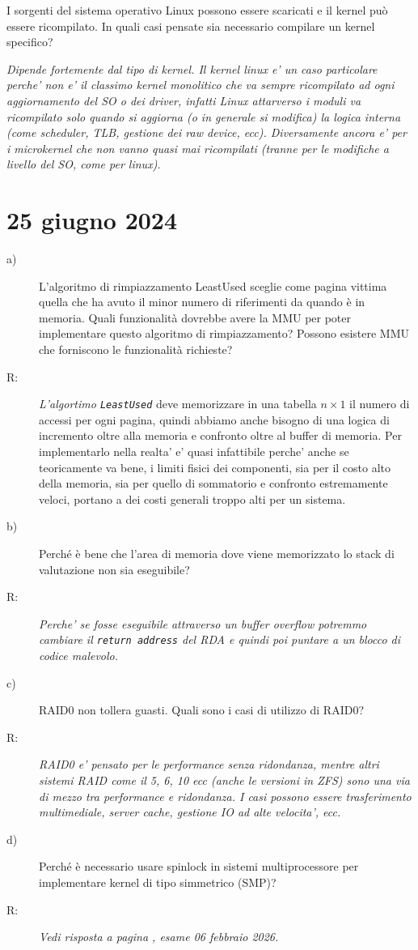 \documentclass[a4paper,12pt]{article}
\newcommand{\datasection}[1]{%
    \section*{#1}%
    \addcontentsline{toc}{section}{#1}%
}
\newenvironment{exambox}{%
    \begin{mdframed}[
        linecolor=black!70,
        linewidth=0.6pt,
        innerleftmargin=8pt,
        innerrightmargin=8pt,
        innertopmargin=6pt,
        innerbottommargin=6pt
    ]
    \begin{description}
}{%
    \end{description}
    \end{mdframed}
}
\begin{document}
\begin{exambox}
{}
\item[d)] I sorgenti del sistema operativo Linux possono essere scaricati e il kernel può essere ricompilato. In quali casi pensate sia necessario compilare un kernel specifico?
\item[R:] \textit{Dipende fortemente dal tipo di kernel. Il kernel linux e' un caso particolare perche' non e' il classimo kernel monolitico che va sempre ricompilato ad ogni aggiornamento del SO o dei driver, infatti Linux attarverso i moduli va ricompilato solo quando si aggiorna (o in generale si modifica) la logica interna (come scheduler, TLB, gestione dei raw device, ecc). Diversamente ancora e' per i microkernel che non vanno quasi mai ricompilati (tranne per le modifiche a livello del SO, come per linux).}
\end{exambox}

\newpage
\datasection{25 giugno 2024}
\begin{exambox}
\item[a)] L'algoritmo di rimpiazzamento LeastUsed sceglie come pagina vittima quella che ha avuto il minor numero di riferimenti da quando è in memoria. Quali funzionalità dovrebbe avere la MMU per poter implementare questo algoritmo di rimpiazzamento? Possono esistere MMU che forniscono le funzionalità richieste?
\item[R:] \textit{L'algortimo \texttt{LeastUsed}} deve memorizzare in una tabella $n\times 1$ il numero di accessi per ogni pagina, quindi abbiamo anche bisogno di una logica di incremento oltre alla memoria e confronto oltre al buffer di memoria. Per implementarlo nella realta' e' quasi infattibile perche' anche se teoricamente va bene, i limiti fisici dei componenti, sia per il costo alto della memoria, sia per quello di sommatorio e confronto estremamente veloci, portano a dei costi generali troppo alti per un sistema.
\item[b)] Perché è bene che l'area di memoria dove viene memorizzato lo stack di valutazione non sia eseguibile?
\item[R:] \textit{Perche' se fosse eseguibile attraverso un buffer overflow potremmo cambiare il \texttt{return address} del RDA e quindi poi puntare a un blocco di codice malevolo.}
\item[c)] RAID0 non tollera guasti. Quali sono i casi di utilizzo di RAID0?
\item[R:] \textit{RAID0 e' pensato per le performance senza ridondanza, mentre altri sistemi RAID come il 5, 6, 10 ecc (anche le versioni in ZFS) sono una via di mezzo tra performance e ridondanza. I casi possono essere trasferimento multimediale, server cache, gestione IO ad alte velocita', ecc.}
\item[d)] Perché è necessario usare spinlock in sistemi multiprocessore per implementare kernel di tipo simmetrico (SMP)?
\item[R:] \textit{Vedi risposta a pagina \pageref{risposta:spinlock}, esame 06 febbraio 2026.}
\end{exambox}
\end{document}
